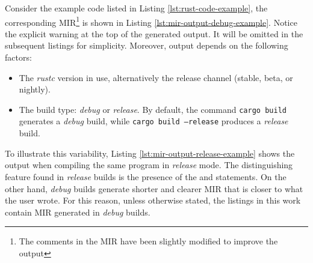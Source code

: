 \documentclass[../Thesis.tex]{subfiles}
\begin{document}
Consider the example code listed in Listing \ref{lst:rust-code-example},
the corresponding \acrshort{MIR}\footnote{The comments in the MIR have been slightly modified to improve the output}
is shown in Listing \ref{lst:mir-output-debug-example}.
Notice the explicit warning at the top of the generated output.
It will be omitted in the subsequent listings for simplicity.
Moreover, output depends on the following factors:

\begin{itemize}
    \item The \emph{rustc} version in use,
          alternatively the release channel (stable, beta, or nightly).
    \item The build type: \emph{debug} or \emph{release}.
          By default, the command \texttt{cargo build} generates a \emph{debug} build,
          while \texttt{cargo build --release} produces a \emph{release} build.
\end{itemize}

To illustrate this variability, Listing \ref{lst:mir-output-release-example}
shows the output when compiling the same program in \emph{release} mode.
The distinguishing feature found in \emph{release} builds is
the presence of the  and  statements.
On the other hand, \emph{debug} builds generate
shorter and clearer \acrshort{MIR} that is closer to what the user wrote.
For this reason, unless otherwise stated,
the listings in this work contain \acrshort{MIR} generated in \emph{debug} builds.
\end{document}
